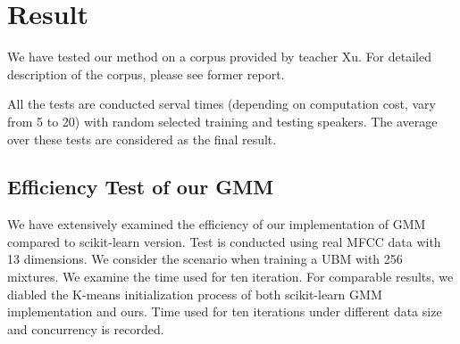 \section{Result}
\label{sec:result}
We have tested our method on a corpus provided by teacher Xu. For detailed
description of the corpus, please see former report.

All the tests are conducted serval times (depending on computation cost,
vary from 5 to 20) with random selected training and testing speakers.
The average over these tests are considered as the final
result.

\subsection{Efficiency Test of our GMM}
We have extensively examined the efficiency of our implementation of GMM
compared to scikit-learn version. Test is conducted using real MFCC data with
13 dimensions. We consider the scenario when training a UBM with 256 mixtures.
We examine the time used for ten iteration.  For comparable results, we diabled
the K-means initialization process of both scikit-learn GMM implementation and
ours.  Time used for ten iterations under different data size and concurrency
is recorded.


